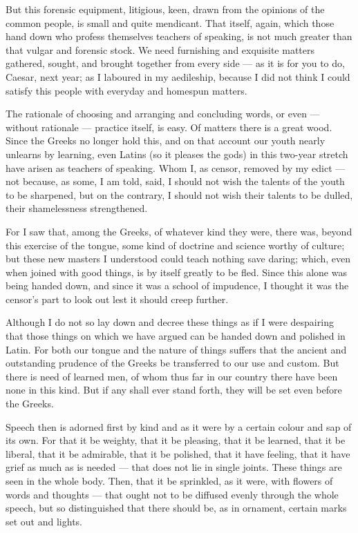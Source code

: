 But this forensic equipment, litigious, keen, drawn from the opinions of the common people, is small and quite mendicant. That itself, again, which those hand down who profess themselves teachers of speaking, is not much greater than that vulgar and forensic stock. We need furnishing and exquisite matters gathered, sought, and brought together from every side — as it is for you to do, Caesar, next year; as I laboured in my aedileship, because I did not think I could satisfy this people with everyday and homespun matters.

 The rationale of choosing and arranging and concluding words, or even — without rationale — practice itself, is easy. Of matters there is a great wood. Since the Greeks no longer hold this, and on that account our youth nearly unlearns by learning, even Latins (so it pleases the gods) in this two-year stretch have arisen as teachers of speaking. Whom I, as censor, removed by my edict — not because, as some, I am told, said, I should not wish the talents of the youth to be sharpened, but on the contrary, I should not wish their talents to be dulled, their shamelessness strengthened.

 For I saw that, among the Greeks, of whatever kind they were, there was, beyond this exercise of the tongue, some kind of doctrine and science worthy of culture; but these new masters I understood could teach nothing save daring; which, even when joined with good things, is by itself greatly to be fled. Since this alone was being handed down, and since it was a school of impudence, I thought it was the censor's part to look out lest it should creep further.

 Although I do not so lay down and decree these things as if I were despairing that those things on which we have argued can be handed down and polished in Latin. For both our tongue and the nature of things suffers that the ancient and outstanding prudence of the Greeks be transferred to our use and custom. But there is need of learned men, of whom thus far in our country there have been none in this kind. But if any shall ever stand forth, they will be set even before the Greeks.

 Speech then is adorned first by kind and as it were by a certain colour and sap of its own. For that it be weighty, that it be pleasing, that it be learned, that it be liberal, that it be admirable, that it be polished, that it have feeling, that it have grief as much as is needed — that does not lie in single joints. These things are seen in the whole body. Then, that it be sprinkled, as it were, with flowers of words and thoughts — that ought not to be diffused evenly through the whole speech, but so distinguished that there should be, as in ornament, certain marks set out and lights.

